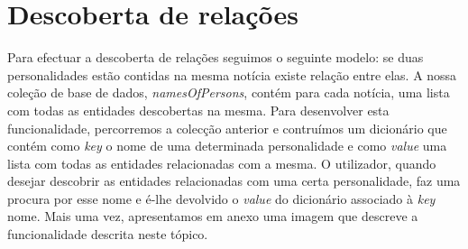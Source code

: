 \section{Descoberta de relações}

Para efectuar a descoberta de relações seguimos o seguinte modelo: se duas personalidades estão contidas na mesma notícia existe relação entre elas.
A nossa coleção de base de dados, \textit{namesOfPersons}, contém para cada notícia, uma lista com todas as entidades descobertas na mesma. Para desenvolver esta funcionalidade, percorremos a colecção anterior e contruímos um dicionário que contém como \textit{key} o nome de uma determinada personalidade e como \textit{value} uma lista com todas as entidades relacionadas com a mesma. O utilizador, quando desejar descobrir as entidades relacionadas com uma certa personalidade, faz uma procura por esse nome e é-lhe devolvido o \textit{value} do dicionário associado à \textit{key} nome. Mais uma vez, apresentamos em anexo uma imagem que descreve a funcionalidade descrita neste tópico.
